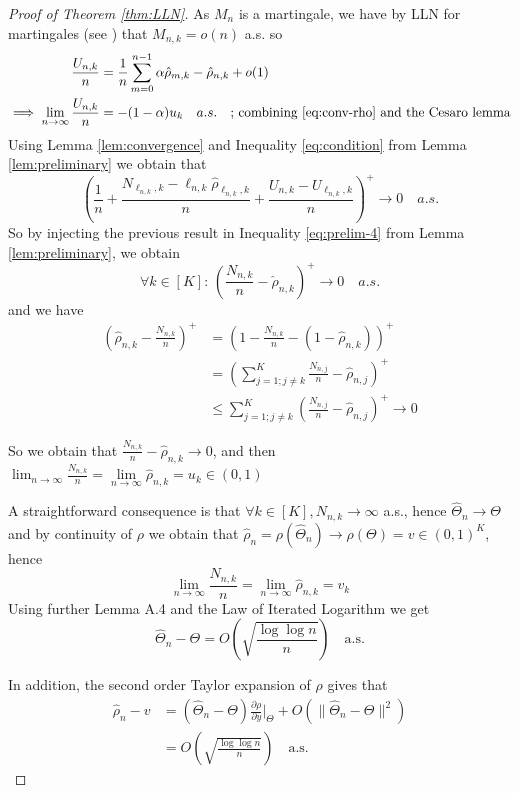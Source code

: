 \documentclass[11pt]{article}
\theoremstyle{plain}
\theoremstyle{definition}
\begin{document}
\begin{appendix}
\begin{proof}[Proof of Theorem \ref{thm:LLN}]
	As \(M_n\) is a martingale, we have by LLN for martingales (see \cite{Chow1967}) that $M_{n,k} = o(n)$ a.s. so
	\begin{align*}
		\frac{U_{n,k}}{n} &= \frac{1}{n} \sum_{m=0}^{n-1} \alpha \hat{\rho}_{m,k} - \hat{\rho}_{n,k} + o(1) \\
		\implies \lim_{n \to \infty} \frac{U_{n,k}}{n} &= - (1 - \alpha) u_k \quad a.s. \quad\text{; combining \eqref{eq:conv-rho} and the Cesaro lemma}
	\end{align*}
	Using Lemma \ref{lem:convergence} and Inequality \eqref{eq:condition} from Lemma \ref{lem:preliminary} we obtain that
	\[
	\left(\frac{1}{n}+\frac{N_{\ell_{n,k},k} - \ell_{n,k} \hat{\rho}_{\ell_{n,k},k}}{n} + \frac{U_{n,k} - U_{\ell_{n,k},k}}{n} \right)^+ \to 0 \quad a.s.
	\]
	So by injecting the previous result in Inequality \eqref{eq:prelim-4} from Lemma \ref{lem:preliminary}, we obtain
	\[
	\forall k \in [K]: \, \left(\frac{N_{n,k}}{n} - \hat{\rho}_{n,k}\right)^+ \to 0 \quad a.s.
	\]
	and we have
	\begin{align*}
		\left(\hat{\rho}_{n,k} - \frac{N_{n,k}}{n}\right)^+ &= \left(1 - \frac{N_{n,k}}{n} - (1 - \hat{\rho}_{n,k})\right)^+ \\
		&= \left(\sum_{j=1; j \neq k}^K \frac{N_{n,j}}{n} - \hat{\rho}_{n,j}\right)^+ \\
		&\leq \sum_{j=1; j \neq k}^K \left(\frac{N_{n,j}}{n} - \hat{\rho}_{n,j}\right)^+  \to 0
	\end{align*}
	
	So we obtain that \(\frac{N_{n,k}}{n} - \hat{\rho}_{n,k} \to 0\),  and then \(\lim_{n \to \infty} \frac{N_{n,k}}{n} = \lim\limits_{n \to \infty} \hat{\rho}_{n,k} = u_k \in (0,1)\)
	
	A straightforward consequence is that $\forall k \in [K], N_{n,k} \to \infty$ a.s., hence $\hat{\Theta}_n \to \Theta$ and by continuity of \(\rho\) we obtain that \(\hat{\rho}_n = \rho(\hat{\Theta}_n) \to \rho(\Theta) = v \in (0,1)^K\), hence
	\[
	\lim_{n \to \infty} \frac{N_{n,k}}{n} = \lim_{n \to \infty} \hat{\rho}_{n,k} = v_k
	\]
	Using further Lemma A.4 \cite{hu2004asymptotic} and the Law of Iterated Logarithm we get
	\[
	\hat{\Theta}_n - \Theta = O\left(\sqrt{\frac{\log\!\log n}{n}}\right) \quad \text{a.s.}
	\]
	
	In addition, the second order Taylor expansion of \(\rho\)  gives that
	\begin{align*}
		\hat{\rho}_n - v  &= (\hat{\Theta}_n-\Theta)\frac{\partial \rho}{\partial y}\Big|_{\Theta} + O(\|\hat{\Theta}_n-\Theta\|^2) \\
		&= O\left(\sqrt{\frac{\log\!\log n}{n}}\right) \quad \text{a.s.}
	\end{align*}
	

\end{proof}
\end{appendix}
\end{document}
